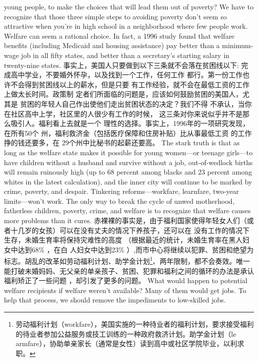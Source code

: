 \begin{paracol}{2}
young people, to make the choices that will lead them out of
poverty? We have to recognize that those three simple steps to
avoiding poverty don't seem so attractive when you're in high
school in a neighborhood where few people work. Welfare can
seem a rational choice. In fact, a 1996 study found that welfare
benefits (including Medicaid and housing assistance) pay better
than a minimum-wage job in all fifty states, and better than a
secretary's starting salary in twenty-nine states.
\switchcolumn
事实上，美国人只要做到以下三条就不会落在贫困线以下:
完成高中学业，不要婚外怀孕，以及找到一个工作，任何工作
都行。第一份工作也许不会得到贫困线以上的薪水，但是只要
有工作经验，就不会在最低工资的工作上做太长时间。政策制
定者们所面临的问题是，应该如何鼓励贫困的美国人，尤其是
贫困的年轻人自己作出使他们走出贫困状态的决定？我们不得
不承认，当你在社区高中上学，社区里的人很少有工作的时候，
这三条对你来说似乎并不是那么吸引人。福利看上去就是一个
理性的选择。事实上，1996年的一项研究发现，在所有50个
州，福利救济金（包括医疗保障和住房补贴）比从事最低工资
的工作挣的钱还要多，在 29个州中比秘书的起薪还要高。
\switchcolumn*
The stark truth is that as long as the welfare state makes it
possible for young women---or teenage girls---to have children
without a husband and survive without a job, out-of-wedlock
births will remain ruinously high (up to 68 percent among
blacks and 23 percent among whites in the latest calculation),
and the inner city will continue to be marked by crime, poverty,
and despair. Tinkering reforms---workfare, learnfare, two-year limits---won't work. The only way to break the cycle of unwed
motherhood, fatherless children, poverty, crime, and welfare is
to recognize that welfare causes more problems than it cures.
\switchcolumn
赤裸裸的事实是，由于福利国家使得年轻女人们（或者十几岁的女孩）可以在没有丈夫的情况下养孩子，还可以在
没有工作的情况下生存，未婚生育率将保持灾难性的高度
（根据最近的统计，未婚生育率在黑人妇女中达到68\% ，在白
人妇女中达到23\% ）,而市中心将继续以犯罪、贫困和绝望为
标志。胡乱的改革如劳动福利计划、助学金计划\footnote{劳动福利计划（workfare），美国实施的一种待业者的福利计划，要求接受福利的待业者参加公益服务或技工训练的一种政府救济计划。助学金计划（le	armfare），协助单亲家长（通常是女性）读到高中或社区学院毕业，以利求职。}、两年限制，都不会奏效。唯一能打破未婚妈妈、无父亲的单亲孩子、贫困、犯罪和福利之间的循环的办法是承认福利矫正了一些问题 ，却引发了更多的问题。
\switchcolumn*
What would happen to potential welfare recipients if welfare
weren't available? Many of them would get jobs. To help that
process, we should remove the impediments to low-skilled jobs.

\end{paracol}
